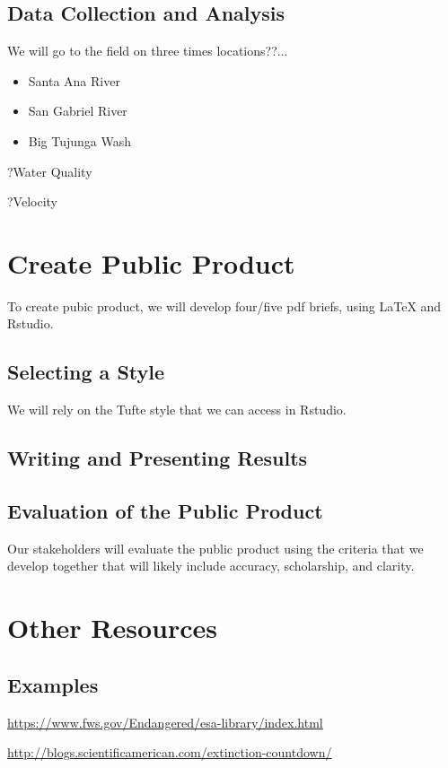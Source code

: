 \documentclass{tufte-handout}\usepackage[]{graphicx}\usepackage[]{color}
\begin{document}
\subsection{Data Collection and Analysis}

We will go to the field on three times locations??...

\begin{itemize}
  \item Santa Ana River
  \item San Gabriel River
  \item Big Tujunga Wash
\end{itemize}


?Water Quality

?Velocity








\section{Create Public Product}

To create pubic product, we will develop four/five pdf briefs, using LaTeX and Rstudio. 

\subsection{Selecting a Style}

We will rely on the Tufte style that we can access in Rstudio. 

\subsection{Writing and Presenting Results}

\subsection{Evaluation of the Public Product}

Our stakeholders will evaluate the public product using the criteria that we develop together that will likely include accuracy, scholarship, and clarity. 

\section{Other Resources}

\subsection{Examples}

\href{https://www.fws.gov/Endangered/esa-library/index.html}{https://www.fws.gov/Endangered/esa-library/index.html}

\href{http://blogs.scientificamerican.com/extinction-countdown/}{http://blogs.scientificamerican.com/extinction-countdown/}
\end{document}
